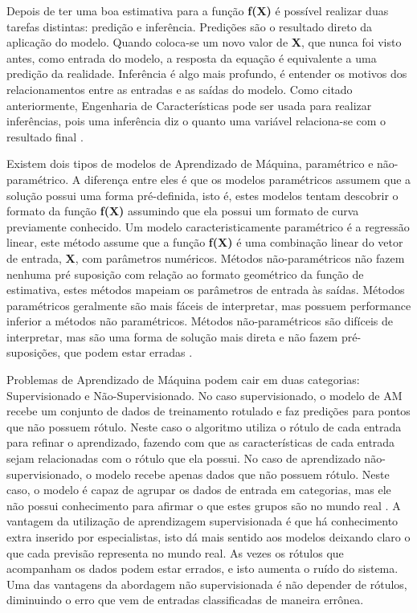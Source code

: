 Depois de ter uma boa estimativa para a função \textbf{f(X)} é possível realizar duas tarefas distintas: predição e inferência. Predições são o resultado direto da aplicação do modelo. Quando coloca-se um novo valor de \textbf{X}, que nunca foi visto antes, como entrada do modelo, a resposta da equação é equivalente a uma predição da realidade. Inferência é algo mais profundo, é entender os motivos dos relacionamentos entre as entradas e as saídas do modelo. Como citado anteriormente, Engenharia de Características pode ser usada para realizar inferências, pois uma inferência diz o quanto uma variável relaciona-se com o resultado final \cite{real2013}. 

Existem dois tipos de modelos de Aprendizado de Máquina, paramétrico e não-paramétrico. A diferença entre eles é que os modelos paramétricos assumem que a solução possui uma forma pré-definida, isto é, estes modelos tentam descobrir o formato da função \textbf{f(X)} assumindo que ela possui um formato de curva previamente conhecido. Um modelo caracteristicamente paramétrico é a regressão linear, este método assume que a função \textbf{f(X)} é uma combinação linear do vetor de entrada, \textbf{X}, com parâmetros numéricos. Métodos não-paramétricos não fazem nenhuma pré suposição com relação ao formato geométrico da função de estimativa, estes métodos mapeiam os parâmetros de entrada às saídas. Métodos paramétricos geralmente são mais fáceis de interpretar, mas possuem performance inferior a métodos não paramétricos. Métodos não-paramétricos são difíceis de interpretar, mas são uma forma de solução mais direta e não fazem pré-suposições, que podem estar erradas \cite{on2014}.

Problemas de Aprendizado de Máquina podem cair em duas categorias: Supervisionado e Não-Supervisionado. No caso supervisionado, o modelo de AM recebe um conjunto de dados de treinamento rotulado e faz predições para pontos que não possuem rótulo. Neste caso o algoritmo utiliza o rótulo de cada entrada para refinar o aprendizado, fazendo com que as características de cada entrada sejam relacionadas com o rótulo que ela possui. No caso de aprendizado não-supervisionado, o modelo recebe apenas dados que não possuem rótulo. Neste caso, o modelo é capaz de agrupar os dados de entrada em categorias, mas ele não possui conhecimento para afirmar o que estes grupos são no mundo real \cite{foundations2012}. A vantagem da utilização de aprendizagem supervisionada é que há conhecimento extra inserido por especialistas, isto dá mais sentido aos modelos deixando claro o que cada previsão representa no mundo real. As vezes os rótulos que acompanham os dados podem estar errados, e isto aumenta o ruído do sistema. Uma das vantagens da abordagem não supervisionada é não depender de rótulos, diminuindo o erro que vem de entradas classificadas de maneira errônea. 

